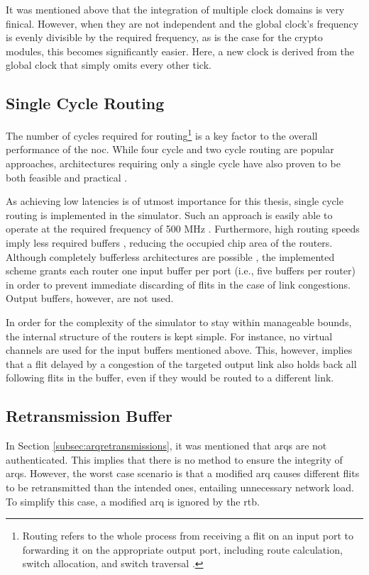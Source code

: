 It was mentioned above that the integration of multiple clock domains is very finical. However, when they are not independent and the global clock's
frequency is evenly divisible by the required frequency, as is the case for the crypto modules, this becomes significantly easier. Here, a new clock
is derived from the global clock that simply omits every other tick.

\subsection{Single Cycle Routing}
The number of cycles required for routing\footnote{Routing refers to the whole process from receiving a flit on an input port to forwarding it on the
appropriate output port, including route calculation, switch allocation, and switch traversal \cite[see][2]{routinglectureutah}.} is a key factor to the
overall performance of the \gls{noc}. While four cycle \cite[e.g.][]{routinglectureutah} and two cycle routing \cite[e.g.][]{lu11nocrouter} are
popular approaches, architectures requiring only a single cycle have also proven to be both feasible and practical
\cites{hayenga09scarab}{ved17routeonfly}.

As achieving low latencies is of utmost importance for this thesis, single cycle routing is implemented in the simulator. Such an approach is easily
able to operate at the required frequency of 500 MHz \cite[7]{hayenga09scarab}. Furthermore, high routing speeds imply less required buffers
\cite[1]{ved17routeonfly}, reducing the occupied chip area of the routers. Although completely bufferless architectures are possible
\cite{hayenga09scarab}, the implemented scheme grants each router one input buffer per port (i.e., five buffers per router) in order to prevent
immediate discarding of flits in the case of link congestions. Output buffers, however, are not used.

In order for the complexity of the simulator to stay within manageable bounds, the internal structure of the routers is kept simple. For instance, no
virtual channels are used for the input buffers mentioned above. This, however, implies that a flit delayed by a congestion of the targeted output
link also holds back all following flits in the buffer, even if they would be routed to a different link.

\subsection{Retransmission Buffer}
In Section \ref{subsec:arqretransmissions}, it was mentioned that \glspl{arq} are not authenticated. This implies that there is no method to ensure
the integrity of \glspl{arq}. However, the worst case scenario is that a modified \gls{arq} causes different flits to be retransmitted than the
intended ones, entailing unnecessary network load. To simplify this case, a modified \gls{arq} is ignored by the \gls{rtb}.

